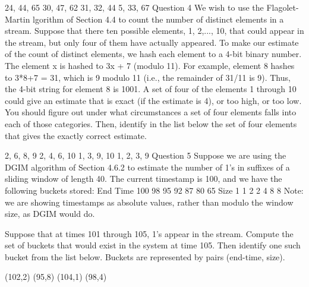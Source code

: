 {24, 44, 65}
{30, 47, 62}
{31, 32, 44}
{5, 33, 67}
Question 4
We wish to use the Flagolet-Martin lgorithm of Section 4.4 to count the number of distinct elements in a stream. Suppose that there ten possible elements, 1, 2,..., 10, that could appear in the stream, but only four of them have actually appeared. To make our estimate of the count of distinct elements, we hash each element to a 4-bit binary number. The element x is hashed to 3x + 7 (modulo 11). For example, element 8 hashes to 3*8+7 = 31, which is 9 modulo 11 (i.e., the remainder of 31/11 is 9). Thus, the 4-bit string for element 8 is 1001.
A set of four of the elements 1 through 10 could give an estimate that is exact (if the estimate is 4), or too high, or too low. You should figure out under what circumstances a set of four elements falls into each of those categories. Then, identify in the list below the set of four elements that gives the exactly correct estimate.

{2, 6, 8, 9}
{2, 4, 6, 10}
{ 1, 3, 9, 10}
{1, 2, 3, 9}
Question 5
Suppose we are using the DGIM algorithm of Section 4.6.2 to estimate the number of 1's in suffixes of a sliding window of length 40. The current timestamp is 100, and we have the following buckets stored:
End Time	100	98	95	92	87	80	65
Size	1	1	2	2	4	8	8
Note: we are showing timestamps as absolute values, rather than modulo the window size, as DGIM would do.

Suppose that at times 101 through 105, 1's appear in the stream. Compute the set of buckets that would exist in the system at time 105. Then identify one such bucket from the list below. Buckets are represented by pairs (end-time, size).

(102,2)
(95,8)
(104,1)
(98,4)
